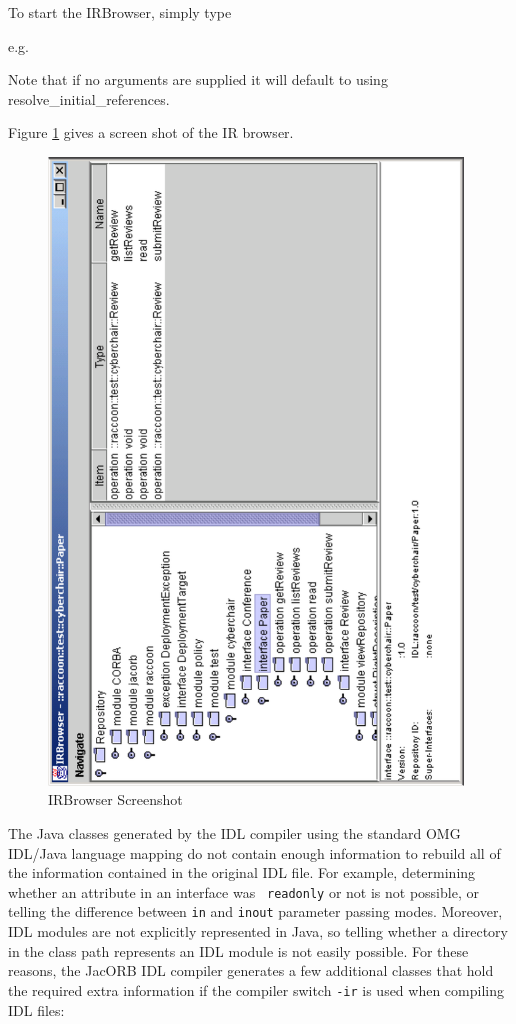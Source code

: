 To start the IRBrowser, simply type


e.g.


Note that if no arguments are supplied it will default to using
resolve\_initial\_references.

Figure \ref{fig:IRBrowser} gives a screen shot of the IR browser.

\bigskip
\begin{figure}[htb]
  \begin{center}
    \includegraphics[width=11cm]{IFR/IRBrowser}
\end{center}
\caption{IRBrowser Screenshot}
\label{fig:IRBrowser}
\end{figure}

The Java classes generated by  the IDL compiler using the standard OMG
IDL/Java language mapping do not contain enough information to rebuild
all  of the  information contained  in  the original  IDL file.   For
example,  determining whether an  attribute in  an interface  was {\tt
readonly} or  not is not  possible, or telling the  difference between
{\tt  in}  and {\tt  inout}  parameter  passing  modes. Moreover,  IDL
modules are not  explicitly represented in Java, so  telling whether a
directory in  the class  path represents an  IDL module is  not easily
possible. For these  reasons, the JacORB IDL compiler  generates a few
additional  classes that hold  the required  extra information  if the
compiler switch {\tt -ir} is used when compiling IDL files:

